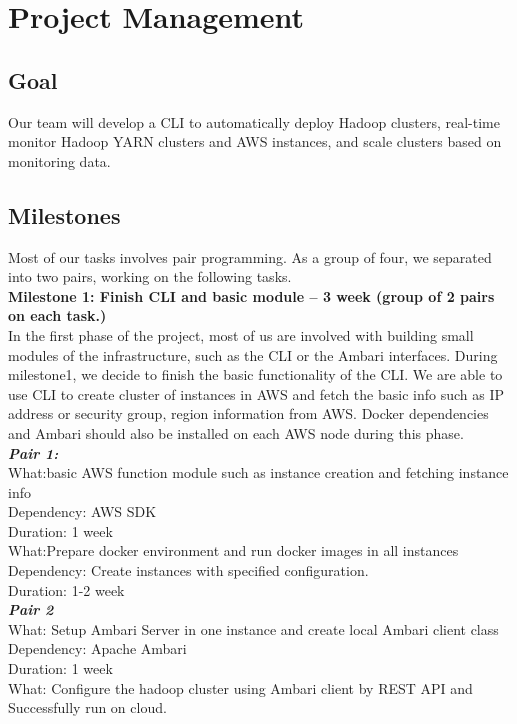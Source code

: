 \documentclass{article}
\begin{document}
\section{Project Management}
\subsection{Goal}

Our team will develop a CLI to automatically deploy Hadoop clusters, real-time monitor  Hadoop YARN clusters and AWS instances, and scale clusters based on monitoring data.

\subsection{Milestones}
Most of our tasks involves pair programming. As a group of four, we separated into two pairs, working on the following tasks.\\
\textbf{Milestone 1: Finish CLI and basic module -- 3 week (group of 2 pairs on each task.)}\\
In the first phase of the project, most of us are involved with building small modules of the infrastructure, such as the CLI or the Ambari interfaces. During milestone1, we decide to finish the basic functionality of the CLI. We are able to use CLI to create cluster of instances in AWS and fetch the basic info such as IP address or security group, region information from AWS. Docker dependencies and Ambari should also be installed on each AWS node during this phase.\\
\emph{\textbf{Pair 1:}}\\
What:basic AWS function module such as instance creation and fetching instance info\\
Dependency: AWS SDK\\
Duration: 1 week\\
What:Prepare docker environment and run docker images in all instances\\
Dependency: Create instances with specified configuration.\\
Duration: 1-2 week\\
\emph{\textbf{Pair 2}}\\
What: Setup Ambari Server in one instance and create local Ambari client class\\
Dependency:  Apache Ambari\\
Duration: 1 week\\
What: Configure the hadoop cluster using Ambari client by REST API and Successfully run on cloud.\\
\end{document}
